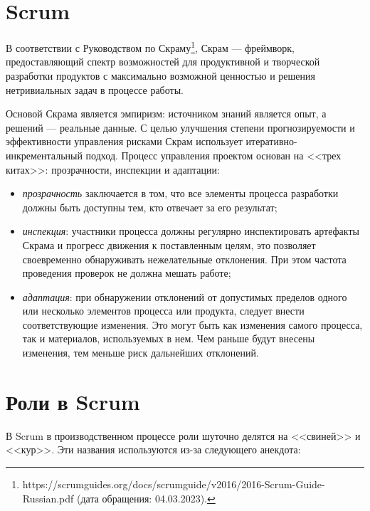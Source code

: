 \documentclass{../../text-style}
\begin{document}
\maketitle
\thispagestyle{empty}


\section{Scrum}

В соответствии с Руководством по Скраму\footnote{https://scrumguides.org/docs/scrumguide/v2016/2016-Scrum-Guide-Russian.pdf (дата обращения: 04.03.2023).}, Скрам --- фреймворк, предоставляющий спектр возможностей для продуктивной и творческой разработки продуктов с максимально возможной ценностью и решения нетривиальных задач в процессе работы.

Основой Скрама является эмпиризм: источником знаний является опыт, а решений --- реальные данные. С целью улучшения степени прогнозируемости и эффективности управления рисками Скрам использует итеративно-инкрементальный подход. Процесс управления проектом основан на <<трех китах>>: прозрачности, инспекции и адаптации:

\begin{itemize}
    \item \emph{прозрачность} заключается в том, что все элементы процесса разработки должны быть доступны тем, кто отвечает за его результат;
    \item \emph{инспекция}: участники процесса должны регулярно инспектировать артефакты Скрама и прогресс движения к поставленным целям, это позволяет своевременно обнаруживать нежелательные отклонения. При этом частота проведения проверок не должна мешать работе;
    \item \emph{адаптация}: при обнаружении отклонений от допустимых пределов одного или несколько элементов процесса или продукта, следует внести соответствующие изменения. Это могут быть как изменения самого процесса, так и материалов, используемых в нем. Чем раньше будут внесены изменения, тем меньше риск дальнейших отклонений.
\end{itemize}

\section{Роли в Scrum}

В Scrum в производственном процессе роли шуточно делятся на <<свиней>> и <<кур>>. Эти названия используются из-за следующего анекдота:
\end{document}
